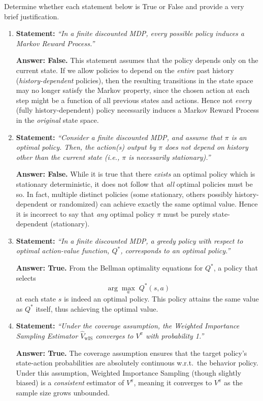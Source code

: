 Determine whether each statement below is True or False and provide a very brief justification.

\begin{enumerate}
    \item \textbf{Statement:} 
    \emph{``In a finite discounted MDP, every possible policy induces a Markov Reward Process.''}

    \textbf{Answer: False.} 
    This statement assumes that the policy depends only on the current state. 
    If we allow policies to depend on the \emph{entire} past history 
    (\emph{history-dependent} policies), 
    then the resulting transitions in the state space may no longer satisfy the Markov property,
    since the chosen action at each step might be a function of all previous states and actions. 
    Hence not \emph{every} (fully history-dependent) policy necessarily induces a Markov Reward Process 
    in the \emph{original} state space.

  \item \textbf{Statement:}
    \emph{``Consider a finite discounted MDP, and assume that $\pi$ is an optimal policy. Then,
    the action(s) output by $\pi$ does not depend on history other than the current state
    (i.e., $\pi$ is necessarily stationary).''}

    \textbf{Answer: False.}
    While it is true that there \emph{exists} an optimal policy which is stationary deterministic, 
    it does not follow that \emph{all} optimal policies must be so. 
    In fact, multiple distinct policies (some stationary, others possibly history-dependent or randomized) 
    can achieve exactly the same optimal value. 
    Hence it is incorrect to say that \emph{any} optimal policy $\pi$ must be purely state-dependent (stationary).

  \item \textbf{Statement:}
    \emph{``In a finite discounted MDP, a greedy policy with respect to optimal action-value
    function, $Q^\ast$, corresponds to an optimal policy.''}

    \textbf{Answer: True.}
    From the Bellman optimality equations for $Q^\ast$, a policy that selects
    \[
      \arg\max_{a} \; Q^\ast(s,a)
    \]
    at each state $s$ is indeed an optimal policy. This policy attains the same value as $Q^\ast$ itself, thus achieving the optimal value.

  \item \textbf{Statement:}
    \emph{``Under the coverage assumption, the Weighted Importance Sampling Estimator $\widehat{V}_{\mathrm{wIS}}$ converges to $V^\pi$ with probability 1.''}

    \textbf{Answer: True.}
    The coverage assumption ensures that the target policy's state-action probabilities are absolutely continuous w.r.t.\ the behavior policy. Under this assumption, Weighted Importance Sampling (though slightly biased) is a \emph{consistent} estimator of $V^\pi$, meaning it converges to $V^\pi$ as the sample size grows unbounded.

\end{enumerate}